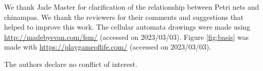 \documentclass[a4paper]{article}\usepackage[english]{babel}
\theoremstyle{definition}
\renewcommand{\emph}[1]{\textbf{#1}}
\begin{document}
{We thank Jade Master for clarification of the relationship between Petri nets and chinampas. We thank the reviewers for their comments and suggestions that helped to improve this work. The cellular automata drawings were made using \url{http://madebyevan.com/fsm/} ({accessed on 2023/03/03}). %
Figure \ref{fig:basis} was made with \url{https://playgameoflife.com/} ({accessed on 2023/03/03}).}

{The authors declare no conflict of interest.}





\printbibliography
%

%
\newpage





\end{document}
